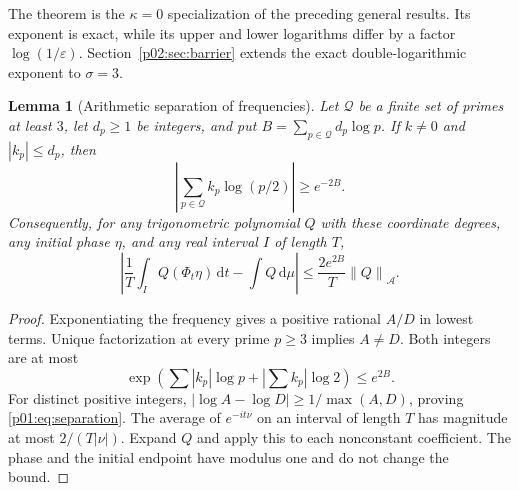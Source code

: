 \documentclass[11pt,letterpaper]{article}
\newtheorem{lemma}[theorem]{Lemma}
\theoremstyle{definition}
\theoremstyle{remark}
\newcommand{\eps}{\varepsilon}
\newcommand{\dd}{\,\mathrm d}
\newcommand{\norm}[1]{\left\lVert#1\right\rVert}
\newcommand{\1}{\mathbf 1}
\begin{document}
The theorem is the $\kappa=0$ specialization of the preceding general
results. Its exponent is exact, while its upper and lower logarithms
differ by a factor $\log(1/\eps)$. Section~\ref{p02:sec:barrier}
extends the exact double-logarithmic exponent to $\sigma=3$.

\begin{lemma}[Arithmetic separation of frequencies]\label{p01:lem:separation}
Let $\mathcal Q$ be a finite set of primes at least $3$, let $d_p\ge1$
be integers, and put $B=\sum_{p\in\mathcal Q}d_p\log p$. If
$k\ne0$ and $|k_p|\le d_p$, then
\begin{equation}\label{p01:eq:separation}
 \left|\sum_{p\in\mathcal Q}k_p\log(p/2)\right|\ge e^{-2B}.
\end{equation}
Consequently, for any trigonometric polynomial $Q$ with these coordinate
degrees, any initial phase $\eta$, and any real interval $I$ of length $T$,
\begin{equation}\label{p01:eq:fourieraverage}
 \left|\frac1T\int_IQ(\Phi_t\eta)\dd t-\int Q\dd\mu\right|
 \le\frac{2e^{2B}}T\norm{Q}_{\mathcal A}.
\end{equation}
\end{lemma}
\begin{proof}
Exponentiating the frequency gives a positive rational $A/D$ in lowest
terms. Unique factorization at every prime $p\ge3$ implies $A\ne D$.
Both integers are at most
\[
 \exp\left(\sum|k_p|\log p+\left|\sum k_p\right|\log2\right)
 \le e^{2B}.
\]
For distinct positive integers,
$|\log A-\log D|\ge1/\max(A,D)$, proving \eqref{p01:eq:separation}.
The average of $e^{-it\nu}$ on an interval of length $T$ has magnitude
at most $2/(T|\nu|)$. Expand $Q$ and apply this to each nonconstant
coefficient. The phase and the initial endpoint have modulus one and
do not change the bound.
\end{proof}
\end{document}
